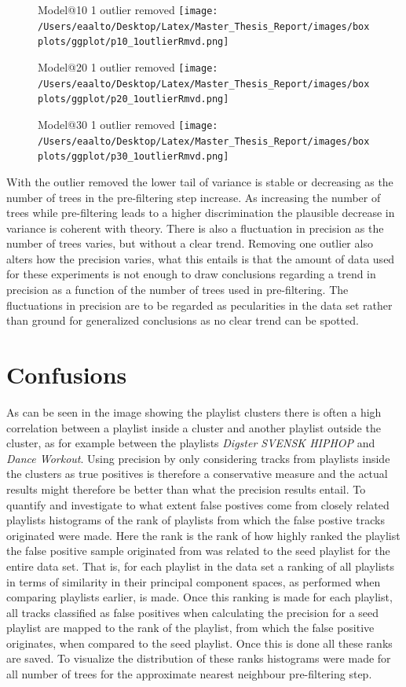 \documentclass[a4paper,11pt]{kth-mag}
\begin{document}
\begin{figure}
Model@10 1 outlier removed
\texttt{[image: /Users/eaalto/Desktop/Latex/Master\_Thesis\_Report/images/boxplots/ggplot/p10\_1outlierRmvd.png]}

Model@20 1 outlier removed
\texttt{[image: /Users/eaalto/Desktop/Latex/Master\_Thesis\_Report/images/boxplots/ggplot/p20\_1outlierRmvd.png]}

Model@30 1 outlier removed
\texttt{[image: /Users/eaalto/Desktop/Latex/Master\_Thesis\_Report/images/boxplots/ggplot/p30\_1outlierRmvd.png]}
\end{figure}


With the outlier removed the lower tail of variance is stable or decreasing as the number of trees in the pre-filtering step increase. As increasing the number of trees while pre-filtering leads to a higher discrimination the plausible decrease in variance is coherent with theory. There is also a fluctuation in precision as the number of trees varies, but without a clear trend. Removing one outlier also alters how the precision varies, what this entails is that the amount of data used for these experiments is not enough to draw conclusions regarding a trend in precision as a function of the number of trees used in pre-filtering. The fluctuations in precision are to be regarded as pecularities in the data set rather than ground for generalized conclusions as no clear trend can be spotted.

\section{Confusions}
As can be seen in the image showing the playlist clusters there is often a high correlation between a playlist inside a cluster and another playlist outside the cluster, as for example between the playlists \textit{Digster SVENSK HIPHOP} and \textit{Dance Workout}. Using precision by only considering tracks from playlists inside the clusters as true positives is therefore a conservative measure and the actual results might therefore be better than what the precision results entail. To quantify and investigate to what extent false postives come from closely related playlists histograms of the rank of playlists from which the false postive tracks originated were made. Here the rank is the rank of how highly ranked the playlist the false positive sample originated from was related to the seed playlist for the entire data set. That is, for each playlist in the data set a ranking of all playlists in terms of similarity in their principal component spaces, as performed when comparing playlists earlier, is made. Once this ranking is made for each playlist, all tracks classified as false positives when calculating the precision for a seed playlist are mapped to the rank of the playlist, from which the false positive originates, when compared to the seed playlist. Once this is done all these ranks are saved. To visualize the distribution of these ranks histograms were made for all number of trees for the approximate nearest neighbour pre-filtering step.
\end{document}
